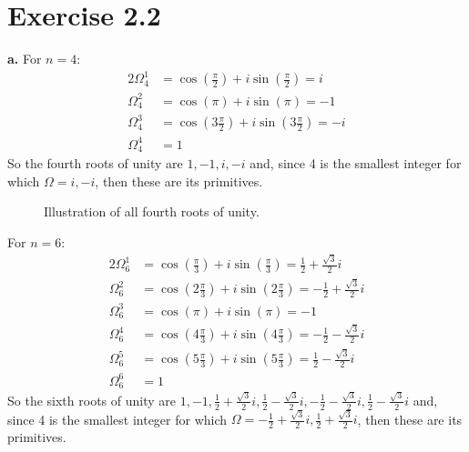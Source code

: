 \documentclass[12pt]{article}
\begin{document}
	\section*{Exercise 2.2}
	\textbf{a.}
	For $n = 4$:
	\begin{alignat*}{2}
	\Omega^1_4 &= \cos(\frac{\pi}{2}) + i \sin (\frac{\pi}{2}) = i\\
	\Omega^2_4 &= \cos(\pi) + i \sin (\pi) = -1\\
	\Omega^3_4 &= \cos(3\frac{\pi}{2}) + i \sin (3\frac{\pi}{2}) = -i\\
	\Omega^4_4 &= 1
	\end{alignat*}
	So the fourth roots of unity are ${1, -1, i, -i}$ and, since 4 is the smallest integer for which $\Omega = {i, -i}$, then these are its primitives.
	\begin{figure}[H]
	\def\n{4}
	\centering
	\caption{Illustration of all fourth roots of unity.}
	\end{figure}
	For $n = 6$:
	\begin{alignat*}{2}
	\Omega^1_6 &= \cos(\frac{\pi}{3}) + i \sin (\frac{\pi}{3}) = \frac{1}{2} + \frac{\sqrt{3}}{2}i\\
	\Omega^2_6 &= \cos(2\frac{\pi}{3}) + i \sin (2\frac{\pi}{3}) = - \frac{1}{2} + \frac{\sqrt{3}}{2}i\\
	\Omega^3_6 &= \cos(\pi) + i \sin (\pi) = -1\\
	\Omega^4_6 &= \cos(4\frac{\pi}{3}) + i \sin (4\frac{\pi}{3}) = - \frac{1}{2} - \frac{\sqrt{3}}{2}i\\
	\Omega^5_6 &= \cos(5\frac{\pi}{3}) + i \sin (5\frac{\pi}{3}) = \frac{1}{2} - \frac{\sqrt{3}}{2}i\\
	\Omega^6_6 &= 1
	\end{alignat*}
	So the sixth roots of unity are ${1, -1, \frac{1}{2} + \frac{\sqrt{3}}{2}i, \frac{1}{2} - \frac{\sqrt{3}}{2}i, -\frac{1}{2} - \frac{\sqrt{3}}{2}i, \frac{1}{2} - \frac{\sqrt{3}}{2}i}$ and, since 4 is the smallest integer for which $\Omega = {- \frac{1}{2} + \frac{\sqrt{3}}{2}i, \frac{1}{2} + \frac{\sqrt{3}}{2}i}$, then these are its primitives.\\
\end{document}
